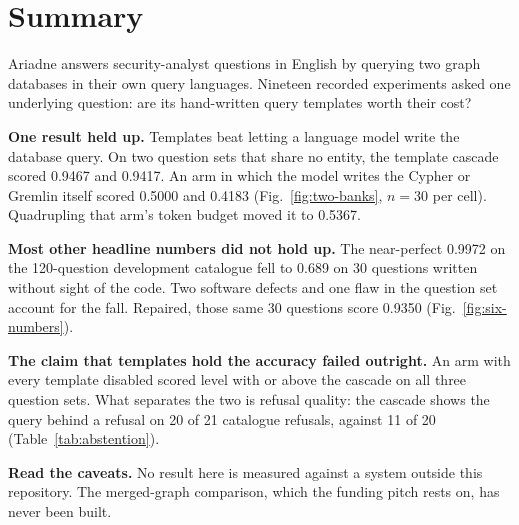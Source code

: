 \section{Summary}

\begin{rrsummary}
Ariadne answers security-analyst questions in English by querying two graph
databases in their own query languages. Nineteen recorded experiments asked one
underlying question: are its hand-written query templates worth their cost?

\textbf{One result held up.} Templates beat letting a language model write the
database query. On two question sets that share no entity, the template cascade
scored 0.9467 and 0.9417. An arm in which the model writes the Cypher or Gremlin
itself scored 0.5000 and 0.4183 (Fig.~\ref{fig:two-banks}, $n = 30$ per cell).
Quadrupling that arm's token budget moved it to 0.5367.

\textbf{Most other headline numbers did not hold up.} The near-perfect 0.9972 on
the 120-question development catalogue fell to 0.689 on 30 questions written
without sight of the code. Two software defects and one flaw in the question set
account for the fall. Repaired, those same 30 questions score 0.9350
(Fig.~\ref{fig:six-numbers}).

\textbf{The claim that templates hold the accuracy failed outright.} An arm with
every template disabled scored level with or above the cascade on all three
question sets. What separates the two is refusal quality: the cascade shows the
query behind a refusal on 20 of 21 catalogue refusals, against 11 of 20
(Table~\ref{tab:abstention}).

\textbf{Read the caveats.} No result here is measured against a system outside
this repository. The merged-graph comparison, which the funding pitch rests on,
has never been built.
\end{rrsummary}

